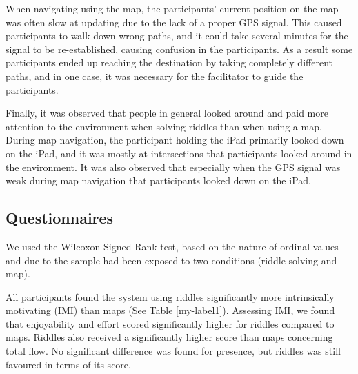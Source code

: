 When navigating using the map, the participants' current position on the map was often slow at updating due to the lack of a proper GPS signal. This caused participants to walk down wrong paths, and it could take several minutes for the signal to be re-established, causing confusion in the participants. As a result some participants ended up reaching the destination by taking completely different paths, and in one case, it was necessary for the facilitator to guide the participants.

Finally, it was observed that people in general looked around and paid more attention to the environment when solving riddles than when using a map. During map navigation, the participant holding the iPad primarily looked down on the iPad, and it was mostly at intersections that participants looked around in the environment. It was also observed that especially when the GPS signal was weak during map navigation that participants looked down on the iPad. 	
\subsection{Questionnaires}
We used the Wilcoxon Signed-Rank test, based on the nature of ordinal values and due to the sample had been exposed to two conditions (riddle solving and map).

All participants found the system using riddles significantly more intrinsically motivating (IMI) than maps (See Table \ref{my-label1}). Assessing IMI, we found that enjoyability and effort scored significantly higher for riddles compared to maps. Riddles also received a significantly higher score than maps concerning total flow. No significant difference was found for presence, but riddles was still favoured in terms of its score. 

